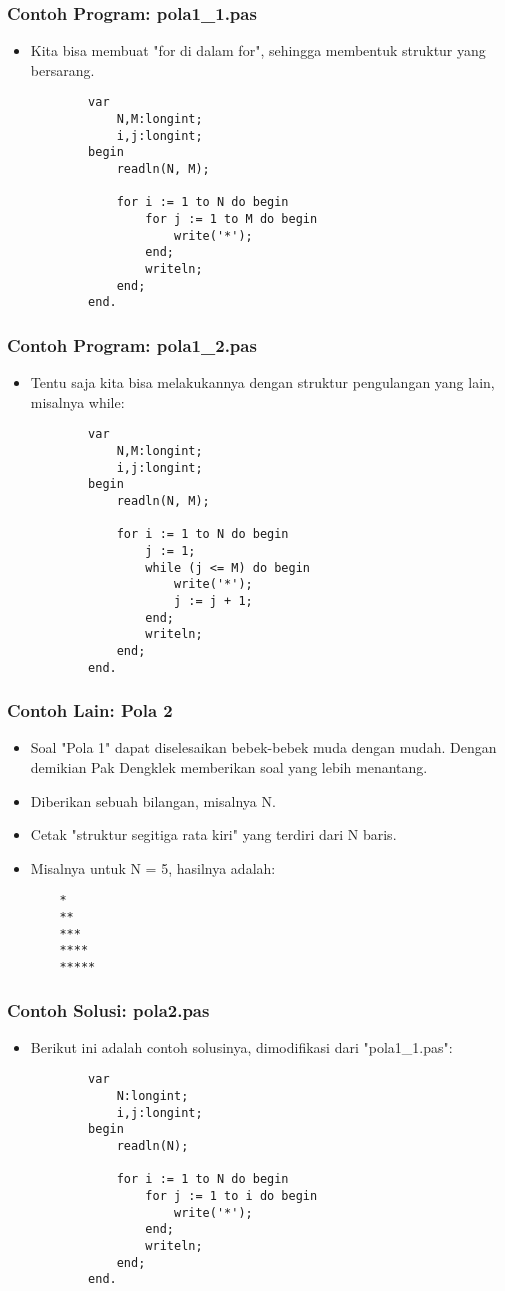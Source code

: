 \documentclass{beamer}
\begin{document}
\begin{frame}[fragile]
\frametitle{Contoh Program: pola1\_1.pas}
\begin{itemize}
	\item Kita bisa membuat "for di dalam for", sehingga membentuk struktur yang bersarang.
	\begin{lstlisting}
		var
		    N,M:longint;
		    i,j:longint;
		begin
		    readln(N, M);
		
		    for i := 1 to N do begin
		        for j := 1 to M do begin
		            write('*');
		        end;
		        writeln;
		    end;
		end.
	\end{lstlisting}
\end{itemize}
\end{frame}

\begin{frame}[fragile]
\frametitle{Contoh Program: pola1\_2.pas}
\begin{itemize}
	\item Tentu saja kita bisa melakukannya dengan struktur pengulangan yang lain, misalnya while:
	\begin{lstlisting}
		var
		    N,M:longint;
		    i,j:longint;
		begin
		    readln(N, M);
		
		    for i := 1 to N do begin
		        j := 1;
		        while (j <= M) do begin
		            write('*');
		            j := j + 1;
		        end;
		        writeln;
		    end;
		end.
	\end{lstlisting}
\end{itemize}
\end{frame}

\begin{frame}[fragile]
\frametitle{Contoh Lain: Pola 2}
\begin{itemize}
	\item Soal "Pola 1" dapat diselesaikan bebek-bebek muda dengan mudah. Dengan demikian Pak Dengklek memberikan soal yang lebih menantang.
	\item Diberikan sebuah bilangan, misalnya N.
	\item Cetak "struktur segitiga rata kiri" yang terdiri dari N baris.
	\item Misalnya untuk N = 5, hasilnya adalah:
	\begin{lstlisting}
	*
	**
	***
	****
	*****
	\end{lstlisting} 
\end{itemize}
\end{frame}

\begin{frame}[fragile]
\frametitle{Contoh Solusi: pola2.pas}
\begin{itemize}
	\item Berikut ini adalah contoh solusinya, dimodifikasi dari "pola1\_1.pas":
	\begin{lstlisting}
		var
		    N:longint;
		    i,j:longint;
		begin
		    readln(N);
		
		    for i := 1 to N do begin
		        for j := 1 to i do begin
		            write('*');
		        end;
		        writeln;
		    end;
		end.
	\end{lstlisting}
\end{itemize}
\end{frame}
\end{document}
